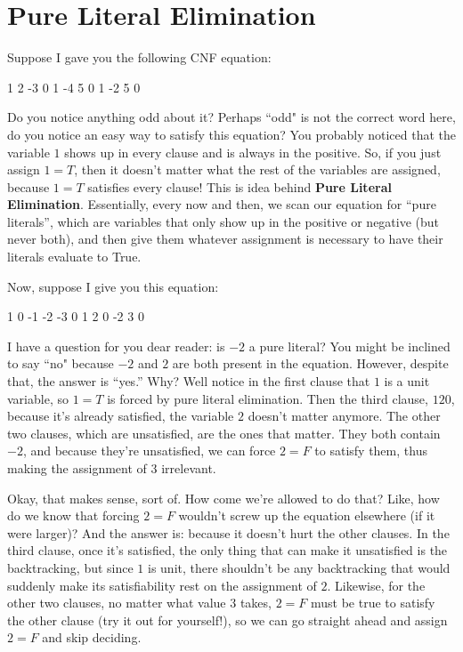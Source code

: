 \section{Pure Literal Elimination}

Suppose I gave you the following CNF equation:

\begin{FVerbatim}
1 2 -3 0
1 -4 5 0
1 -2 5 0
\end{FVerbatim}

Do you notice anything odd about it? Perhaps ``odd" is not the correct word here, do you notice 
an easy way to satisfy this equation? You probably noticed that the variable $1$ shows up in every 
clause and is always in the positive. So, if you just assign $1 = T$, then it doesn't matter what 
the rest of the variables are assigned, because $1 = T$ satisfies every clause! This is idea behind 
\textbf{Pure Literal Elimination}. Essentially, every now and then, we scan our equation for ``pure 
literals'', which are variables that only show up in the positive or negative (but never both), and
then give them whatever assignment is necessary to have their literals evaluate to True. 

Now, suppose I give you this equation:
\begin{FVerbatim}
1 0
-1 -2 -3 0
1 2 0
-2 3 0
\end{FVerbatim}

I have a question for you dear reader: is $-2$ a pure literal? You might be inclined to say ``no"
because $-2$ and $2$ are both present in the equation. However, despite that, the answer is ``yes.''
Why? Well notice in the first clause that $1$ is a unit variable, so $1 = T$ is forced by pure literal 
elimination. Then the third clause, $1 2 0$, because it's already satisfied, the variable $2$
doesn't matter anymore. The other two clauses, which are unsatisfied, are the ones that matter. 
They both contain $-2$, and because they're unsatisfied, we can force $2 = F$ to satisfy them,
thus making the assignment of $3$ irrelevant. 

Okay, that makes sense, sort of. How come we're allowed to do that? Like, how do we know that 
forcing $2 = F$ wouldn't screw up the equation elsewhere (if it were larger)? And the answer is:
because it doesn't hurt the other clauses. In the third clause, once it's satisfied, the only thing 
that can make it unsatisfied is the backtracking, but since $1$ is unit, there shouldn't be any 
backtracking that would suddenly make its satisfiability rest on the assignment of $2$. Likewise, 
for the other two clauses, no matter what value $3$ takes, $2 = F$ must be true to satisfy the 
other clause (try it out for yourself!), so we can go straight ahead and assign $2 = F$ and skip 
deciding. 

